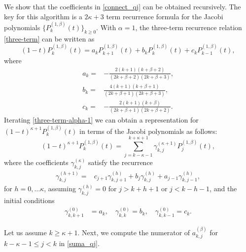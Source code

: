 \documentclass{amsart}
\theoremstyle{plain}%
\theoremstyle{definition}
\theoremstyle{remark}
\begin{document}
We show that the coefficients in \eqref{connect_qj} can be obtained recursively. The key for this algorithm is a \(2\kappa+3\) term recurrence formula for the Jacobi polynomials \(\{P_{k}^{(1, \beta)}(t)\}_{k\geqslant 0}\).
With \(\alpha = 1\), the three-term recurrence relation \eqref{three-term} can be written as
\begin{equation} \label{three-term-alpha-1}
(1-t)P_k^{(1,\beta)}(t) = a_k P_{k+1}^{(1,\beta)}(t) + b_k P_k^{(1,\beta)}(t) + c_k P_{k-1}^{(1,\beta)}(t),
\end{equation}
where
\begin{align*}
a_k =& -\frac{2(k+1)(k + \beta+2)}{(2k + \beta+2)(2k +\beta+3)},\\
b_k =&  \frac{4(k+1)(k + \beta+1)}{(2k + \beta+1)(2k +\beta+3)}, \\
c_k =&-\frac{2(k+1)(k + \beta)}{(2k + \beta+1)(2k +\beta+2)}.
\end{align*}
Iterating \eqref{three-term-alpha-1} we can obtain a representation for \((1-t)^{\kappa+1}P_k^{(1,\beta)}(t)\) in terms of the Jacobi polynomials as follows:
\begin{equation} \label{coef:gamma}
(1-t)^{\kappa+1}P_k^{(1,\beta)}(t) = \sum_{j=k-\kappa-1}^{k+\kappa+1} \gamma_{k,j}^{(\kappa+1)} P_j^{(1,\beta)}(t),
\end{equation}
where the coefficients \(\gamma_{k,j}^{(\kappa)}\) satisfy the recurrence
\begin{align*}
\gamma_{k,j}^{(h+1)} =&  c_{j+1} \gamma_{k,j+1}^{(h)} + b_j \gamma_{k,j}^{(h)}+ a_{j-1} \gamma_{k,j-1}^{(h)},
\end{align*}
for  \(h = 0, \ldots \kappa\), assuming \(\gamma_{k,j}^{(h)}= 0\) for \(j>k+h+1\) or \(j<k-h-1\), and the initial conditions
\begin{align*}
\gamma_{k,k+1}^{(0)} &= a_k, \quad
\gamma_{k,k}^{(0)} = b_k, \quad
\gamma_{k,k-1}^{(0)} = c_k.
\end{align*}

Let us assume \(k \geqslant \kappa+1\). Next, we compute the numerator of \(a^{(\beta)}_{k,j}\) for \(k-\kappa-1 \leqslant j < k\) in \eqref{suma_qj}. 
\end{document}
